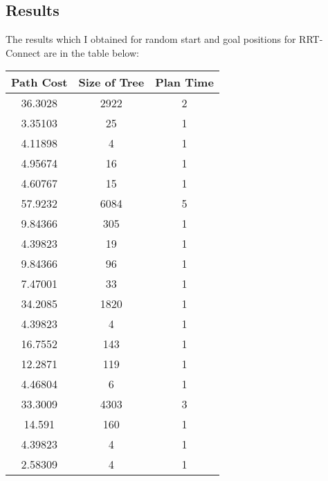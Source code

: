 \documentclass[12pt]{article}
\begin{document}
\subsection{Results}
The results which I obtained for random start and goal positions for RRT-Connect are in the table below:
\begin{table}[h]
\centering
\begin{tabular}{|c|c|c|}
\hline
\textbf{Path Cost}  & \textbf{Size of Tree} & \textbf{Plan Time} \\ \hline
36.3028    & 2922            & 2         \\ \hline
3.35103    & 25              & 1         \\ \hline
4.11898    & 4               & 1         \\ \hline
4.95674    & 16              & 1         \\ \hline
4.60767    & 15              & 1         \\ \hline
57.9232    & 6084            & 5         \\ \hline
9.84366    & 305             & 1         \\ \hline
4.39823    & 19              & 1         \\ \hline
9.84366    & 96              & 1         \\ \hline
7.47001    & 33              & 1         \\ \hline
34.2085    & 1820            & 1         \\ \hline
4.39823    & 4               & 1         \\ \hline
16.7552    & 143             & 1         \\ \hline
12.2871    & 119             & 1         \\ \hline
4.46804    & 6               & 1         \\ \hline
33.3009    & 4303            & 3         \\ \hline
14.591     & 160             & 1         \\ \hline
4.39823    & 4               & 1         \\ \hline
2.58309    & 4               & 1         \\ \hline
\end{tabular}
\end{table}
\end{document}
